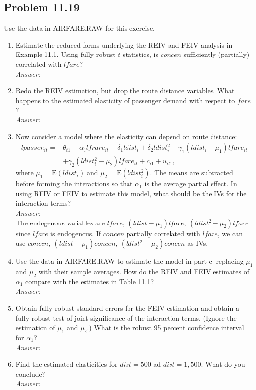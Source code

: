 \documentclass[10pt]{article}
\newcommand{\E}{\text{E}}
\begin{document}
\subsection*{Problem 11.19}
Use the data in AIRFARE.RAW for this exercise.
\begin{enumerate}[label=\alph*.]
\item Estimate the reduced forms underlying the REIV and FEIV analysis in Example 11.1. Using fully robust $t$ statistics, is $concen$ sufficiently (partially) correlated with $lfare$?
\\ \textit{Answer:}\\

\item Redo the REIV estimation, but drop the route distance variables. What happens to the estimated elasticity of passenger demand with respect to $fare$?
\\ \textit{Answer:}\\

\item Now consider a model where the elasticity can depend on route distance:
\begin{align*}
    lpassen_{it}=&\theta_{t1}+\alpha_1 lfrare_{it}+\delta_1 ldist_i+\delta_2 ldist_i^2+\gamma_1(ldist_i-\mu_1)lfare_{it}\\
    &+\gamma_2(ldist_i^2-\mu_2)lfare_{it}+c_{i1}+u_{it1},
\end{align*}
where $\mu_1=\E(ldist_i)$ and $\mu_2=\E(ldist_i^2)$. The means are subtracted before forming the interactions so that $\alpha_1$ is the average partial effect. In using REIV or FEIV to estimate this model, what should be the IVs for the interaction terms?
\\ \textit{Answer:}\\
The endogenous variables are $lfare,\ (ldist-\mu_1)lfare,\ (ldist^2-\mu_2)lfare$ since $lfare$ is endogenous. If $concen$ partially correlated with $lfare$, we can use $concen,\ (ldist-\mu_1)concen,\ (ldist^2-\mu_2)concen$ as IVs.

\item Use the data in AIRFARE.RAW to estimate the model in part c, replacing $\mu_1$ and $\mu_2$ with their sample averages. How do the REIV and FEIV estimates of $\alpha_1$ compare with the estimates in Table 11.1?
\\ \textit{Answer:}\\

\item Obtain fully robust standard errors for the FEIV estimation and obtain a fully robust test of joint significance of the interaction terms. (Ignore the estimation of $\mu_1$ and $\mu_2$.) What is the robust 95 percent confidence interval for $\alpha_1$?
\\ \textit{Answer:}\\

\item Find the estimated elasticities for $dist=500$ ad $dist=1,500.$ What do you conclude?
\\ \textit{Answer:}\\

\end{enumerate}
\end{document}
